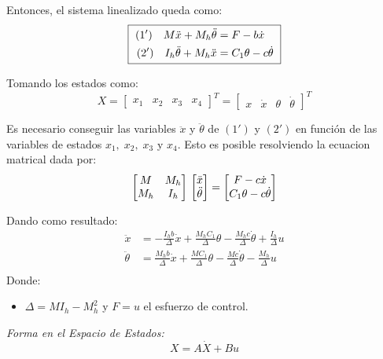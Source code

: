 \documentclass[final,times,twocolumn,5p]{ResumenEjecutivo}
\begin{document}
Entonces, el sistema linealizado queda como:
\[
\fbox{
  $\begin{aligned}
  (1') \quad M\ddot{x} + M_h\ddot{\theta}&= F-b\dot{x}\\
  (2') \quad I_h\ddot{\theta} +M_h\ddot{x}&= C_1\theta-c\dot{\theta}
  \end{aligned}$
}
\]

Tomando los estados como:
\[
X=
\begin{bmatrix}
x_1&x_2&x_3&x_4 
\end{bmatrix}^T
=\begin{bmatrix}
x&\dot{x}&\theta&\dot{\theta} 
\end{bmatrix}^T
\]

Es necesario conseguir las variables $\ddot{x}$ y $\ddot{\theta}$ de $(1')$ y $(2')$ en función de las variables de estados $x_1,\;x_2,\;x_3$ y $x_4$. Esto es posible resolviendo la ecuacion matrical dada por:
\[
\begin{bmatrix}
M & M_h \\
M_h & I_h \\
\end{bmatrix}\\
\begin{bmatrix}
\ddot{x}\\
\ddot{\theta} \\
\end{bmatrix} =
\begin{bmatrix}
F-c\dot{x}\\
C_1\theta-c\dot{\theta} \\
\end{bmatrix}
\]

Dando como resultado: 
\[
  \begin{aligned}
  \ddot{x}&=\displaystyle-\frac{I_hb}{\Delta}\dot{x}+\frac{M_hC_1}{\Delta}\theta-\frac{M_hc}{\Delta}\dot{\theta}+\frac{I_h}{\Delta}u\\
  \ddot{\theta}&= \displaystyle\frac{M_hb}{\Delta}\dot{x}+\frac{MC_1}{\Delta}\theta-\frac{Mc}{\Delta}\dot{\theta}-\frac{M_h}{\Delta}u\\
  \end{aligned}
\]
Donde:
\begin{itemize}
    \item $\Delta=MI_h-M_h^2$ y $F=u$ el esfuerzo de control.\\
\end{itemize}

\textit{Forma en el Espacio de Estados:}\\
\[
X=A\dot{X}+Bu
\]
\end{document}
